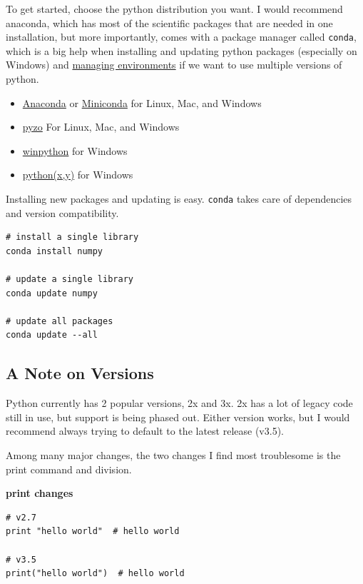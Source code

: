 \documentclass[%
oneside,                 %
final,                   %
10pt]{article}
\begin{document}
To get started, choose the python distribution you want. I would recommend anaconda, which has most of the scientific packages that are needed in one installation, but more importantly, comes with a package manager called \texttt{conda}, which is a big help when installing and updating python packages (especially on Windows) and \href{{http://conda.pydata.org/docs/using/envs.html}}{managing environments} if we want to use multiple versions of python.

\begin{itemize}
\item \href{{https://www.continuum.io/downloads#34}}{Anaconda} or \href{{http://conda.pydata.org/miniconda.html}}{Miniconda} for Linux, Mac, and Windows

\item \href{{http://www.pyzo.org/index.html}}{pyzo} For Linux, Mac, and Windows

\item \href{{http://winpython.sourceforge.net/}}{winpython} for Windows

\item \href{{http://python-xy.github.io/}}{python(x,y)} for Windows
\end{itemize}

\noindent
Installing new packages and updating is easy. \texttt{conda} takes care of dependencies and version compatibility.

\begin{Verbatim}[numbers=none,fontsize=\fontsize{9pt}{9pt},baselinestretch=0.95,xleftmargin=2mm]
# install a single library
conda install numpy

# update a single library
conda update numpy

# update all packages
conda update --all
\end{Verbatim}


\subsection{A Note on Versions}

Python currently has 2 popular versions, 2x and 3x. 2x has a lot of legacy code still in use, but support is being phased out. Either version works, but I would recommend always trying to default to the latest release (v3.5).

Among many major changes, the two changes I find most troublesome is the print command and division.


\textbf{print changes}
\begin{Verbatim}[numbers=none,fontsize=\fontsize{9pt}{9pt},baselinestretch=0.95,xleftmargin=2mm]
# v2.7
print "hello world"  # hello world

# v3.5
print("hello world")  # hello world
\end{Verbatim}
\end{document}
